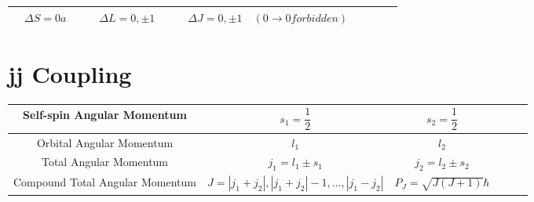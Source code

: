 \begin{table*}[h]
  \centering
  \begin{tabular}{|Sc|Sc|Sc|}
    \hline
    $\quad \Delta S = 0a\quad$ & $\quad \Delta L = 0, \pm 1 \quad$ & $\quad \Delta J = 0,\pm 1 \quad \left( 0 \rightarrow 0 forbidden \right) \quad$ \\
    \hline
  \end{tabular}
\end{table*}

\section{jj Coupling}

\begin{table*}[h]
  \centering
  \begin{tabular}{|Sc|Sc|Sc|}
    \hline
    Self-spin Angular Momentum & $s_1 = \dfrac{1}{2}  $ & $s_2 = \dfrac{1}{2} $  \\
    \hline
    Orbital Angular Momentum & $l_1$ & $l_2$  \\
    \hline
    Total Angular Momentum & $j_1 = l_1 \pm s_1$ & $j_2 = l_2 \pm s_2$  \\
    \hline
    Compound Total Angular Momentum & $J = | j_1 + j_2 |, | j_1 + j_2 | - 1, \dots , | j_1 - j_2 | $ & $P_J = \sqrt{J \left( J + 1 \right)} \hbar$  \\
    \hline
  \end{tabular}
\end{table*}





